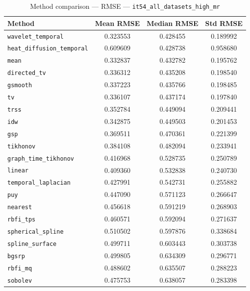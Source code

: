 \begin{table}[ht]
\centering
\caption{Method comparison — RMSE — \texttt{it54_all_datasets_high_mr}}
\label{tab:rmse_it54_all_datasets_high_mr}
\begin{tabular}{lccc}
\hline
Method & Mean RMSE & Median RMSE & Std RMSE \\
\hline
\texttt{wavelet_temporal} & 0.323553 & 0.428455 & 0.189992 \\
\texttt{heat_diffusion_temporal} & 0.609609 & 0.428738 & 0.958680 \\
\texttt{mean} & 0.332837 & 0.432782 & 0.195762 \\
\texttt{directed_tv} & 0.336312 & 0.435208 & 0.198540 \\
\texttt{gsmooth} & 0.337223 & 0.435766 & 0.198485 \\
\texttt{tv} & 0.336107 & 0.437174 & 0.197840 \\
\texttt{trss} & 0.352784 & 0.449094 & 0.209441 \\
\texttt{idw} & 0.342875 & 0.449503 & 0.201453 \\
\texttt{gsp} & 0.369511 & 0.470361 & 0.221399 \\
\texttt{tikhonov} & 0.384108 & 0.482094 & 0.233941 \\
\texttt{graph_time_tikhonov} & 0.416968 & 0.528735 & 0.250789 \\
\texttt{linear} & 0.409360 & 0.532838 & 0.240730 \\
\texttt{temporal_laplacian} & 0.427991 & 0.542731 & 0.255882 \\
\texttt{puy} & 0.447090 & 0.571123 & 0.266647 \\
\texttt{nearest} & 0.456618 & 0.591219 & 0.268903 \\
\texttt{rbfi_tps} & 0.460571 & 0.592094 & 0.271637 \\
\texttt{spherical_spline} & 0.510502 & 0.597876 & 0.338684 \\
\texttt{spline_surface} & 0.499711 & 0.603443 & 0.303738 \\
\texttt{bgsrp} & 0.499805 & 0.634309 & 0.296771 \\
\texttt{rbfi_mq} & 0.488602 & 0.635507 & 0.288223 \\
\texttt{sobolev} & 0.475753 & 0.638057 & 0.283398 \\
\hline
\end{tabular}
\end{table}

